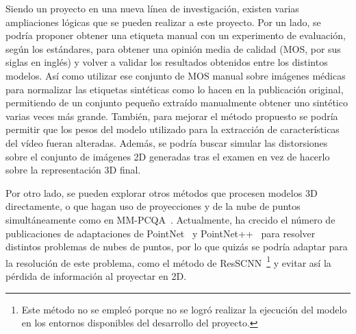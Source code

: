 Siendo un proyecto en una nueva línea de investigación, existen varias ampliaciones 
lógicas que se pueden realizar a este proyecto. Por un lado, se podría proponer 
obtener una etiqueta manual con un experimento de evaluación, según los estándares, para 
obtener una opinión media de calidad (MOS, por sus siglas en inglés) y volver a validar los resultados obtenidos
entre los distintos modelos. Así como utilizar ese conjunto de MOS manual sobre imágenes médicas 
para normalizar las etiquetas sintéticas como lo hacen en la publicación original, 
permitiendo de un conjunto pequeño extraído manualmente obtener uno sintético varias 
veces más grande. También, para mejorar el método propuesto se podría permitir 
que los pesos del modelo utilizado para la extracción de características 
del vídeo fueran alteradas. Además, se podría buscar simular las distorsiones 
sobre el conjunto de imágenes 2D generadas tras el examen en vez de hacerlo 
sobre la representación 3D final. 

Por otro lado, se pueden explorar otros métodos que procesen modelos 3D directamente, 
o que hagan uso de proyecciones y de la nube de puntos simultáneamente como en MM-PCQA~\cite{MM-PCQA}.
Actualmente, ha crecido el número de publicaciones de adaptaciones de PointNet~\cite{PointNet} y 
PointNet++~\cite{PointNet++} para resolver distintos problemas de nubes de puntos, 
por lo que quizás se podría adaptar para la resolución de este problema, como 
el método de ResSCNN~\cite{ResSCNN}\footnote{Este método no se empleó porque no se 
logró realizar la ejecución del modelo en los entornos disponibles 
del desarrollo del proyecto.} y evitar así 
la pérdida de información al proyectar en 2D.


